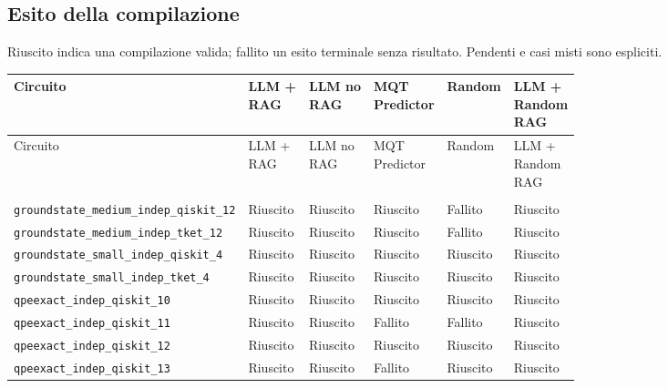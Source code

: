 \subsection{Esito della compilazione}
Riuscito indica una compilazione valida; fallito un esito terminale senza risultato. Pendenti e casi misti sono espliciti.
\begingroup\small
\setlength{\tabcolsep}{5pt}
\begin{longtable}{>{\raggedright\arraybackslash}p{6.0cm}>{\centering\arraybackslash}p{1.75cm}>{\centering\arraybackslash}p{1.75cm}>{\centering\arraybackslash}p{1.75cm}>{\centering\arraybackslash}p{1.75cm}>{\centering\arraybackslash}p{1.75cm}}
\toprule
Circuito & \shortstack{LLM +\\RAG} & \shortstack{LLM no\\RAG} & \shortstack{MQT\\Predictor} & Random & \shortstack{LLM +\\Random\\RAG} \\
\midrule
\endfirsthead
\toprule
Circuito & \shortstack{LLM +\\RAG} & \shortstack{LLM no\\RAG} & \shortstack{MQT\\Predictor} & Random & \shortstack{LLM +\\Random\\RAG} \\
\midrule\endhead
\midrule\multicolumn{6}{r}{\footnotesize Segue nella pagina successiva}\\
\endfoot
\bottomrule\endlastfoot
\nolinkurl{groundstate_medium_indep_qiskit_12} & Riuscito & Riuscito & Riuscito & Fallito & Riuscito \\
\nolinkurl{groundstate_medium_indep_tket_12} & Riuscito & Riuscito & Riuscito & Fallito & Riuscito \\
\nolinkurl{groundstate_small_indep_qiskit_4} & Riuscito & Riuscito & Riuscito & Riuscito & Riuscito \\
\nolinkurl{groundstate_small_indep_tket_4} & Riuscito & Riuscito & Riuscito & Riuscito & Riuscito \\
\nolinkurl{qpeexact_indep_qiskit_10} & Riuscito & Riuscito & Riuscito & Riuscito & Riuscito \\
\nolinkurl{qpeexact_indep_qiskit_11} & Riuscito & Riuscito & Fallito & Fallito & Riuscito \\
\nolinkurl{qpeexact_indep_qiskit_12} & Riuscito & Riuscito & Riuscito & Riuscito & Riuscito \\
\nolinkurl{qpeexact_indep_qiskit_13} & Riuscito & Riuscito & Fallito & Riuscito & Riuscito \\

\end{longtable}
